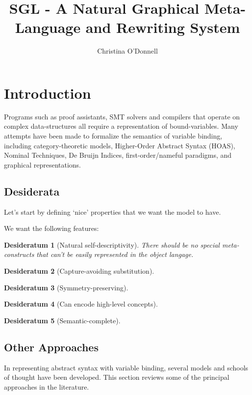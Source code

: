 \documentclass[a4paper,UKenglish,cleveref,autoref,thm-restate]{lipics-v2021}
\title{SGL - A Natural Graphical Meta-Language and Rewriting System}
\author{Christina O'Donnell}{Univerisity of Nottingham}{cdo@mutix.org}{}{}
\newtheorem{desideratum}{Desideratum}[theorem]
\begin{document}
\maketitle

\section{Introduction}
Programs such as proof assistants, SMT solvers and compilers that operate on
complex data-structures all require a representation of bound-variables. Many
attempts have been made to formalize the semantics of variable binding,
including category-theoretic models, Higher-Order Abstract Syntax (HOAS),
Nominal Techniques, De Bruijn Indices, first-order/nameful paradigms, and
graphical representations.

\subsection{Desiderata}
Let's start by defining `nice' properties that we want the model to have.

We want the following features:

\begin{desideratum}[Natural self-descriptivity]
\label{self-descriptivity}
There should be no special meta-constructs that can't be easily represented in the
object langage.
\end{desideratum}

\begin{desideratum}[Capture-avoiding substitution]
\label{capture-avoiding}

\end{desideratum}

\begin{desideratum}[Symmetry-preserving]
\label{symmetry-preserving}
\end{desideratum}

\begin{desideratum}[Can encode high-level concepts]
\label{high-level}
\end{desideratum}

\begin{desideratum}[Semantic-complete]
\label{semantic-completeness}
\end{desideratum}

\subsection{Other Approaches}
In representing abstract syntax with variable binding, several models and
schools of thought have been developed. This section reviews some of the
principal approaches in the literature.
\end{document}
